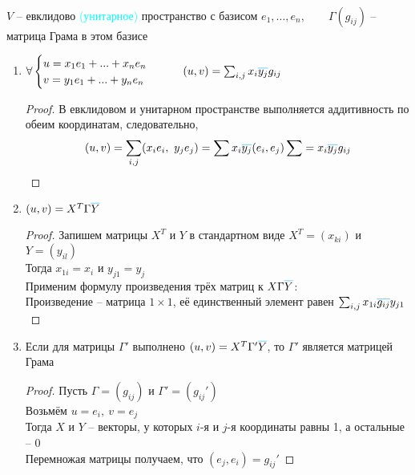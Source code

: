 \begin{theorem}
	\hfill \\
	$ V $ -- евклидово \textcolor{cyan}{(унитарное)} пространство с базисом $ e_1, ..., e_n, \qquad \Gamma(g_{ij}) $ -- матрица Грама в этом базисе
	\begin{enumerate}
		\item $ \forall
		\begin{cases}
			u = x_1e_1 + ... + x_ne_n \\
			v = y_1e_1 + ... + y_ne_n
		\end{cases} \qquad (u, v) = \sum_{i,j} x_i\color{cyan}\overline{\color{black}y_j}\color{black}g_{ij} $
		\begin{proof}
			В евклидовом и унитарном пространстве выполняется аддитивность по обеим координатам, следовательно,
			$$ (u, v) = \sum_{i, j} (x_ie_i, ~ y_je_j) = \sum x_i\color{cyan}\overline{\color{black}y_j}\color{black}(e_i, e_j) \sum = x_i\color{cyan}\overline{\color{black}y_j}\color{black}g_{ij} $$
		\end{proof}
		\item $ (u, v) = X^T\Gamma\color{cyan}\overline{\color{black}Y} $
		\begin{proof}
			Запишем матрицы $ X^T $ и $ Y $ в стандартном виде $ X^T = (x_{ki}) $ и $ Y = (y_{il}) $ \\
			Тогда $ x_{1i} = x_i $ и $ y_{j1} = y_j $ \\
			Применим формулу произведения трёх матриц к $ X\Gamma\color{cyan}\overline{\color{black}Y} $: \\
			Произведение -- матрица $ 1 \times 1 $, её единственный элемент равен $ \sum_{i, j} x_{1i}\color{cyan}\overline{\color{black}g_{ij}}\color{black}y_{j1} $
		\end{proof}
		\item Если для матрицы $ \Gamma' $ выполнено $ (u, v) = X^T\Gamma'\color{cyan}\overline{\color{black}Y} $, то $ \Gamma' $ является матрицей Грама
		\begin{proof}
			Пусть $ \Gamma = (g_{ij}) $ и $ \Gamma' = (g_{ij}') $ \\
			Возьмём $ u = e_i, ~ v = e_j $ \\
			Тогда $ X $ и $ Y $ -- векторы, у которых $ i $-я и $ j $-я координаты равны 1, а остальные -- 0 \\
			Перемножая матрицы получаем, что $ (e_j, e_i) = g_{ij}' $
		\end{proof}
	\end{enumerate}
\end{theorem}

